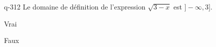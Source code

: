 \begin{truefalse}{q-312}
Le domaine de définition de l'expression $\sqrt{3-x}$ est $]-\infty,3]$.
\item* Vrai
\item Faux
\end{truefalse}

